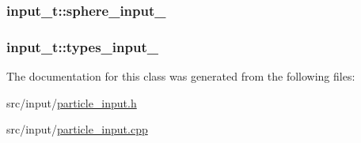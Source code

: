 \subsubsection[{\texorpdfstring{sphere\+\_\+input\+\_\+}{sphere_input_}}]{ input\+\_\+t\+::sphere\+\_\+input\+\_\+\hspace{0.3cm}{\ttfamily [protected]}}\hypertarget{classinput__t_af9cafaeb8d3c98067e4a27edf2c2339e}{}\label{classinput__t_af9cafaeb8d3c98067e4a27edf2c2339e}
\subsubsection[{\texorpdfstring{types\+\_\+input\+\_\+}{types_input_}}]{ input\+\_\+t\+::types\+\_\+input\+\_\+\hspace{0.3cm}{\ttfamily [protected]}}\hypertarget{classinput__t_af064e28d005941bce91337b136403cce}{}\label{classinput__t_af064e28d005941bce91337b136403cce}


The documentation for this class was generated from the following files\+:\begin{DoxyCompactItemize}
\item 
src/input/\hyperlink{particle__input_8h}{particle\+\_\+input.\+h}\item 
src/input/\hyperlink{particle__input_8cpp}{particle\+\_\+input.\+cpp}\end{DoxyCompactItemize}
